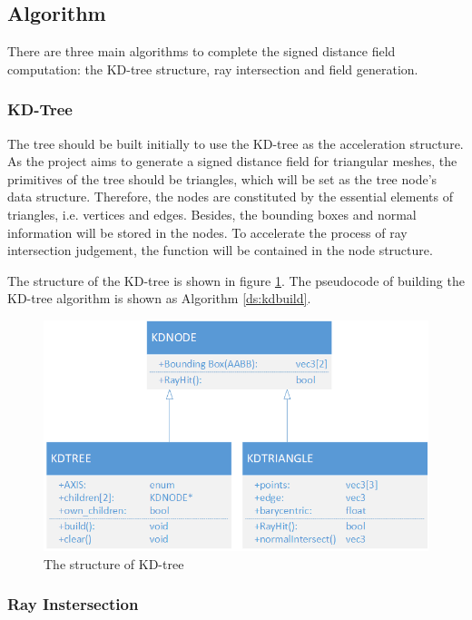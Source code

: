 \subsection{Algorithm}

There are three main algorithms to complete the signed distance field computation: the KD-tree structure, ray intersection and field generation.

\subsubsection{KD-Tree}
The tree should be built initially to use the KD-tree as the acceleration structure. As the project aims to generate a signed distance field for triangular meshes, the primitives of the tree should be triangles, which will be set as the tree node's data structure. Therefore, the nodes are constituted by the essential elements of triangles, i.e. vertices and edges. Besides, the bounding boxes and normal information will be stored in the nodes. To accelerate the process of ray intersection judgement, the function will be contained in the node structure.

\hspace*{\fill}

The structure of the KD-tree is shown in figure \ref{ds:kd}. The pseudocode of building the KD-tree algorithm is shown as Algorithm \ref{ds:kdbuild}.

\begin{figure}[htbp]
    \centering
    \includegraphics[width=15.5cm]{Images/Chap4/kdtree.png}
    \caption{The structure of KD-tree}
    \label{ds:kd}
\end{figure}

\subsubsection{Ray Instersection}

